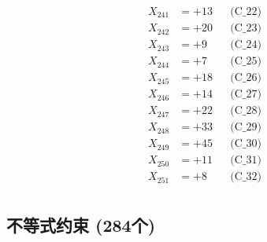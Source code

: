\documentclass[a4paper,10pt]{article}
\begin{document}
{\begin{align}
X_{241} &= +13 && \text{(C\_22)} \\
X_{242} &= +20 && \text{(C\_23)} \\
X_{243} &= +9 && \text{(C\_24)} \\
X_{244} &= +7 && \text{(C\_25)} \\
\allowbreak
X_{245} &= +18 && \text{(C\_26)} \\
X_{246} &= +14 && \text{(C\_27)} \\
X_{247} &= +22 && \text{(C\_28)} \\
X_{248} &= +33 && \text{(C\_29)} \\
X_{249} &= +45 && \text{(C\_30)} \\
\allowbreak
X_{250} &= +11 && \text{(C\_31)} \\
X_{251} &= +8 && \text{(C\_32)} \\
\end{align}
}

\subsection{不等式约束 (284个)}
\end{document}
